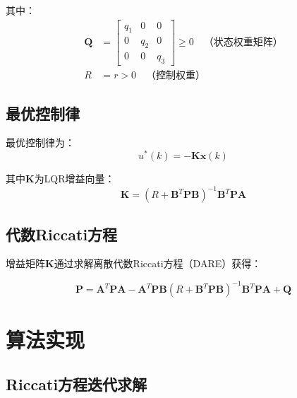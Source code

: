 \documentclass{article}
\begin{document}
其中：
\begin{align}
\mathbf{Q} &= \begin{bmatrix}
q_1 & 0 & 0 \\
0 & q_2 & 0 \\
0 & 0 & q_3
\end{bmatrix} \geq 0 \quad \text{（状态权重矩阵）} \\
R &= r > 0 \quad \text{（控制权重）}
\end{align}

\subsection{最优控制律}

最优控制律为：
\begin{equation}
u^*(k) = -\mathbf{K}\mathbf{x}(k)
\end{equation}

其中$\mathbf{K}$为LQR增益向量：
\begin{equation}
\mathbf{K} = (R + \mathbf{B}^T\mathbf{P}\mathbf{B})^{-1}\mathbf{B}^T\mathbf{P}\mathbf{A}
\end{equation}

\subsection{代数Riccati方程}

增益矩阵$\mathbf{K}$通过求解离散代数Riccati方程（DARE）获得：

\begin{equation}
\mathbf{P} = \mathbf{A}^T\mathbf{P}\mathbf{A} - \mathbf{A}^T\mathbf{P}\mathbf{B}(R + \mathbf{B}^T\mathbf{P}\mathbf{B})^{-1}\mathbf{B}^T\mathbf{P}\mathbf{A} + \mathbf{Q}
\end{equation}

\section{算法实现}

\subsection{Riccati方程迭代求解}
\end{document}
